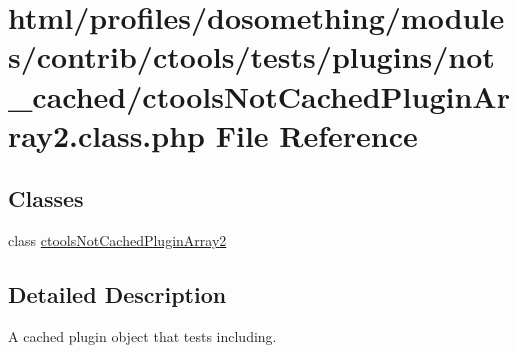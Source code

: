 \hypertarget{ctoolsNotCachedPluginArray2_8class_8php}{
\section{html/profiles/dosomething/modules/contrib/ctools/tests/plugins/not\_\-cached/ctoolsNotCachedPluginArray2.class.php File Reference}
\label{ctoolsNotCachedPluginArray2_8class_8php}
}
\subsection*{Classes}
\begin{DoxyCompactItemize}
\item 
class \hyperlink{classctoolsNotCachedPluginArray2}{ctoolsNotCachedPluginArray2}
\end{DoxyCompactItemize}


\subsection{Detailed Description}
A cached plugin object that tests including. 